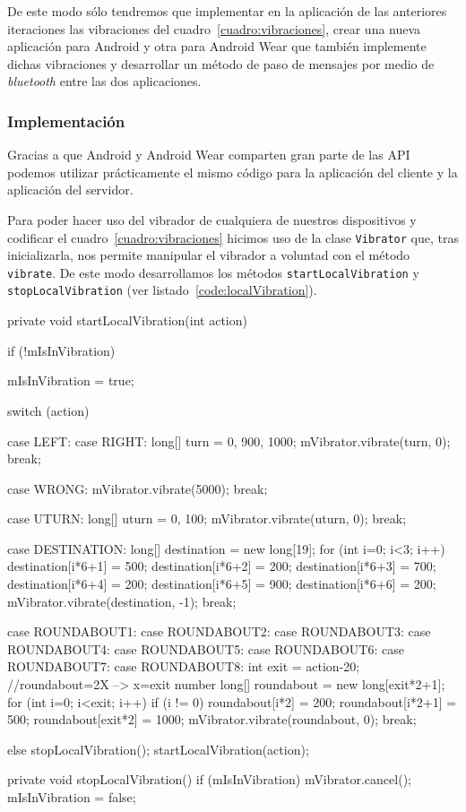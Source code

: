 De este modo sólo tendremos que implementar en la aplicación de las anteriores iteraciones las
vibraciones del cuadro~\ref{cuadro:vibraciones}, crear una nueva aplicación para Android y otra para
Android Wear que también implemente dichas vibraciones y desarrollar un método de paso de mensajes
por medio de \emph{bluetooth} entre las dos aplicaciones.

\subsubsection{Implementación}

Gracias a que Android y Android Wear comparten gran parte de las \acs{API} podemos utilizar
prácticamente el mismo código para la aplicación del cliente y la aplicación del servidor.

Para poder hacer uso del vibrador de cualquiera de nuestros dispositivos y codificar el
cuadro~\ref{cuadro:vibraciones} hicimos uso de la clase \texttt{Vibrator} que, tras inicializarla,
nos permite manipular el vibrador a voluntad con el método \texttt{vibrate}. De este modo
desarrollamos los métodos \texttt{startLocalVibration} y \texttt{stopLocalVibration} (ver
listado~\ref{code:localVibration}).

\begin{listing}[
  float=ht,
  language = java,
  caption  = {Métodos usados para hacer vibrar el dispositivo con la clase \texttt{Vibrator}},
  label    = code:localVibration]
private void startLocalVibration(int action) {
  if (!mIsInVibration) {
    mIsInVibration = true;
    
    switch (action) {
      case LEFT:
      case RIGHT:
        long[] turn = {0, 900, 1000};
        mVibrator.vibrate(turn, 0);
        break;
		
      case WRONG:
        mVibrator.vibrate(5000);
        break;
				
      case UTURN:
        long[] uturn = {0, 100};
        mVibrator.vibrate(uturn, 0);
        break;
			
      case DESTINATION:
        long[] destination = new long[19];
        for (int i=0; i<3; i++) {
          destination[i*6+1] = 500;
          destination[i*6+2] = 200;
          destination[i*6+3] = 700;
          destination[i*6+4] = 200;
          destination[i*6+5] = 900;
          destination[i*6+6] = 200;
        }
        mVibrator.vibrate(destination, -1);
        break;

      case ROUNDABOUT1:  case ROUNDABOUT2:  case ROUNDABOUT3:
      case ROUNDABOUT4:  case ROUNDABOUT5:  case ROUNDABOUT6:
      case ROUNDABOUT7:  case ROUNDABOUT8:
        int exit = action-20; //roundabout=2X --> x=exit number
        long[] roundabout = new long[exit*2+1];
        for (int i=0; i<exit; i++) {
          if (i != 0) roundabout[i*2] = 200;
            roundabout[i*2+1] = 500;
          }
          roundabout[exit*2] = 1000;
          mVibrator.vibrate(roundabout, 0);
          break;
    }
  } else {
    stopLocalVibration();
    startLocalVibration(action);
  }
}
private void stopLocalVibration() {
  if (mIsInVibration) {
    mVibrator.cancel();
    mIsInVibration = false;
  }
}
\end{listing}

